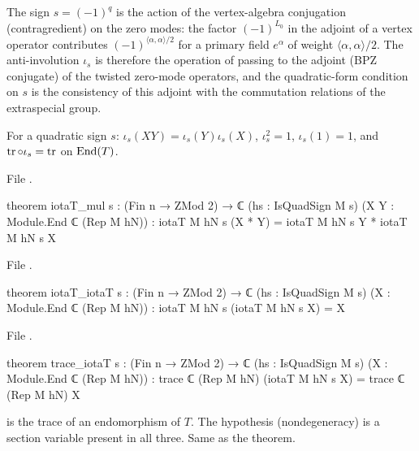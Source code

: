 \begin{physics}
The sign $s=(-1)^{q}$ is the action of the vertex-algebra conjugation (contragredient) on the zero modes: the factor $(-1)^{L_0}$ in the adjoint of a vertex operator contributes $(-1)^{\langle\alpha,\alpha\rangle/2}$ for a primary field $e^{\alpha}$ of weight $\langle\alpha,\alpha\rangle/2$. The anti-involution $\iota_s$ is therefore the operation of passing to the adjoint (BPZ conjugate) of the twisted zero-mode operators, and the quadratic-form condition on $s$ is the consistency of this adjoint with the commutation relations of the extraspecial group.
\end{physics}
\begin{theorem}\label{ch06:thm:iota}
For a quadratic sign $s$: $\iota_s(XY)=\iota_s(Y)\iota_s(X)$, $\iota_s^2=1$, $\iota_s(1)=1$, and
$\operatorname{tr}\circ\iota_s=\operatorname{tr}$ on $\operatorname{End}(T)$.
\end{theorem}
\noindent File .
\begin{leancode}
theorem iotaT_mul {s : (Fin n → ZMod 2) → ℂ} (hs : IsQuadSign M s)
    (X Y : Module.End ℂ (Rep M hN)) : iotaT M hN s (X * Y) = iotaT M hN s Y * iotaT M hN s X
\end{leancode}
\noindent File .
\begin{leancode}
theorem iotaT_iotaT {s : (Fin n → ZMod 2) → ℂ} (hs : IsQuadSign M s)
    (X : Module.End ℂ (Rep M hN)) : iotaT M hN s (iotaT M hN s X) = X
\end{leancode}
\noindent File .
\begin{leancode}
theorem trace_iotaT {s : (Fin n → ZMod 2) → ℂ} (hs : IsQuadSign M s)
    (X : Module.End ℂ (Rep M hN)) : trace ℂ (Rep M hN) (iotaT M hN s X) = trace ℂ (Rep M hN) X
\end{leancode}
\begin{dictionary}
 is the trace of an endomorphism of $T$.  The hypothesis 
(nondegeneracy) is a section variable present in all three.  Same as the theorem.
\end{dictionary}

